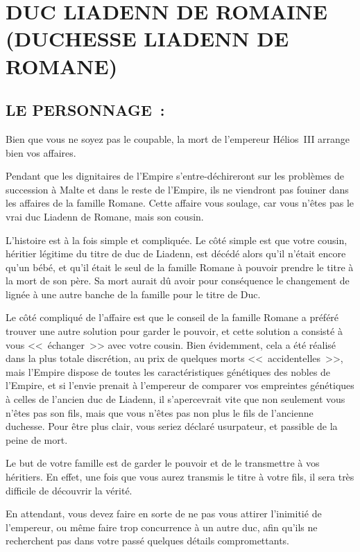 \documentclass[14pt,twocolumn]{extarticle}
\begin{document}
\section{DUC LIADENN DE ROMAINE\\(DUCHESSE LIADENN DE ROMANE)}

\subsection{LE PERSONNAGE~:}

Bien que vous ne soyez pas le coupable, la mort de l'empereur Hélios~III
arrange bien vos affaires.

Pendant que les dignitaires de l'Empire s'entre-déchireront sur les problèmes
de succession à Malte et dans le reste de l'Empire, ils ne viendront pas
fouiner dans les affaires de la famille Romane. Cette affaire vous soulage, car
vous n'êtes pas le vrai duc Liadenn de Romane, mais son cousin.

L'histoire est à la fois simple et compliquée. Le côté simple est que votre
cousin, héritier légitime du titre de duc de Liadenn, est décédé alors qu'il
n'était encore qu'un bébé, et qu'il était le seul de la famille Romane à
pouvoir prendre le titre à la mort de son père. Sa mort aurait dû avoir pour
conséquence le changement de lignée à une autre banche de la famille pour le
titre de Duc.

Le côté compliqué de l'affaire est que le conseil de la famille Romane a
préféré trouver une autre solution pour garder le pouvoir, et cette solution a
consisté à vous <<~échanger~>> avec votre cousin. Bien évidemment, cela a été
réalisé dans la plus totale discrétion, au prix de quelques morts
<<~accidentelles~>>, mais l'Empire dispose de toutes les caractéristiques
génétiques des nobles de l'Empire, et si l'envie prenait à l'empereur de
comparer vos empreintes génétiques à celles de l'ancien duc de Liadenn, il
s'apercevrait vite que non seulement vous n'êtes pas son fils, mais que vous
n'êtes pas non plus le fils de l'ancienne duchesse. Pour être plus clair, vous
seriez déclaré usurpateur, et passible de la peine de mort.

Le but de votre famille est de garder le pouvoir et de le transmettre à vos
héritiers. En effet, une fois que vous aurez transmis le titre à votre fils, il
sera très difficile de découvrir la vérité.

En attendant, vous devez faire en sorte de ne pas vous attirer l'inimitié de
l'empereur, ou même faire trop concurrence à un autre duc, afin qu'ils ne
recherchent pas dans votre passé quelques détails compromettants.
\end{document}
